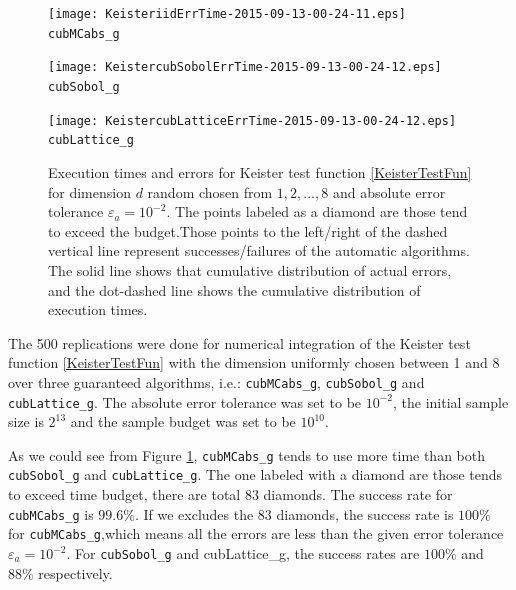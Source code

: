 \documentclass{iitthesis}
\theoremstyle{definition}
\begin{document}
\begin{figure}
\centering
\begin{minipage}{9cm} \centering \texttt{[image: KeisteriidErrTime-2015-09-13-00-24-11.eps]} \\ {\tt cubMCabs\_g} \end{minipage}
\begin{minipage}{7cm} \centering \texttt{[image: KeistercubSobolErrTime-2015-09-13-00-24-12.eps]} \\ {\tt cubSobol\_g} \end{minipage}
\begin{minipage}{7cm} \centering \texttt{[image: KeistercubLatticeErrTime-2015-09-13-00-24-12.eps]} \\ {\tt cubLattice\_g} \end{minipage}
\caption{Execution times and errors for Keister test function \eqref{KeisterTestFun} for dimension $d$ random chosen from $1, 2, \ldots, 8$ and absolute error tolerance $\varepsilon_a=10^{-2}$. The points labeled as a diamond are those tend to exceed the budget.Those points to the left/right of the dashed vertical line represent successes/failures of the automatic algorithms.  The solid line shows that cumulative distribution of actual errors, and the dot-dashed line shows the cumulative distribution of execution times. \label{fig:keistertestfunabstol}}
\end{figure}

The 500 replications were done for numerical integration of the Keister test function \eqref{KeisterTestFun} with the dimension uniformly chosen between 1 and 8 over three guaranteed algorithms, i.e.: {\tt cubMCabs\_g}, {\tt cubSobol\_g} and {\tt cubLattice\_g}. The absolute error tolerance was set to be $10^{-2}$, the initial sample size is $2^{13}$ and the sample budget was set to be $10^{10}$.

As we could see from Figure \ref{fig:keistertestfunabstol}, {\tt cubMCabs\_g} tends to use more time than both {\tt cubSobol\_g} and {\tt cubLattice\_g}. The one labeled with a diamond are those tends to exceed time budget, there are total 83 diamonds. The success rate for {\tt cubMCabs\_g} is $99.6\%$. If we excludes the 83 diamonds, the success rate is $100\%$ for {\tt cubMCabs\_g},which means all the errors are less than the given error tolerance $\varepsilon_a = 10^{-2}$. For {\tt cubSobol\_g} and {cubLattice\_g}, the success rates are $100\%$ and $88\%$ respectively.
\end{document}
